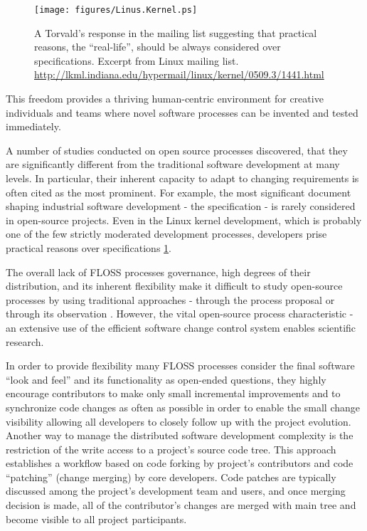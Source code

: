 \begin{figure}[ht!]
   \centering
   \texttt{[image: figures/Linus.Kernel.ps]}
   \caption{A Torvald's response in the mailing list suggesting that practical reasons, the ``real-life'', 
   should be always considered over specifications.
   Excerpt from Linux mailing list. \url{http://lkml.indiana.edu/hypermail/linux/kernel/0509.3/1441.html}}
   \label{fig:kernel}
\end{figure}This freedom provides a thriving human-centric 
environment for creative individuals and teams where novel software processes can be invented and tested 
immediately.

A number of studies conducted on open source processes discovered, that they are significantly 
different from the traditional software development at many levels. In particular, their inherent capacity 
to adapt to changing requirements is often cited as the most prominent. 
For example, the most significant document shaping industrial software development - the specification - is rarely 
considered in open-source projects. Even in the Linux kernel development, which is probably one of the few strictly 
moderated development processes, developers prise practical reasons over specifications \ref{fig:kernel}.

The overall lack of FLOSS processes governance, high degrees of their distribution, and its inherent flexibility make 
it difficult to study open-source processes by using traditional approaches - through the process proposal or through 
its observation \cite{citeulike:12550640} \cite{citeulike:10377366}.
However, the vital open-source process characteristic - an extensive use of the efficient software change control 
system enables scientific research. 

In order to provide flexibility many FLOSS processes consider the final software ``look and feel'' and its functionality 
as open-ended questions, they highly encourage contributors to make only small incremental 
improvements and to synchronize code changes as often as possible \cite{so-checkin} \cite{git-best-practices1}
in order to enable the small change visibility allowing all developers to closely follow up with the project evolution.
Another way to manage the distributed software development complexity is the restriction of the write access to 
a project's source code tree. This approach establishes a workflow based on code forking by project's contributors 
and code ``patching'' (change merging) by core developers. Code patches are typically discussed among the project's
development team and users, and once merging decision is made, all of the contributor's changes are merged 
with main tree and become visible to all project participants.

